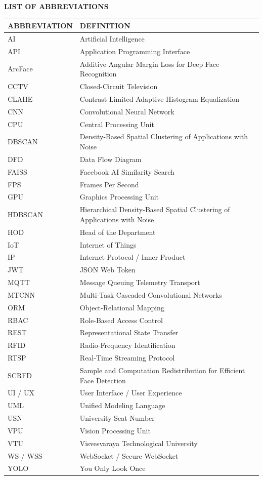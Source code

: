 \newpage
\begin{center}
{\Large \textbf{LIST OF ABBREVIATIONS}}\\[6mm]
\end{center}
\begin{center}
\renewcommand{\arraystretch}{1.3}
\begin{tabular}{p{4cm} p{10cm}}
\toprule
\textbf{ABBREVIATION} & \textbf{DEFINITION} \\
\midrule
AI & Artificial Intelligence \\
API & Application Programming Interface \\
ArcFace & Additive Angular Margin Loss for Deep Face Recognition \\
CCTV & Closed-Circuit Television \\
CLAHE & Contrast Limited Adaptive Histogram Equalization \\
CNN & Convolutional Neural Network \\
CPU & Central Processing Unit \\
DBSCAN & Density-Based Spatial Clustering of Applications with Noise \\
DFD & Data Flow Diagram \\
FAISS & Facebook AI Similarity Search \\
FPS & Frames Per Second \\
GPU & Graphics Processing Unit \\
HDBSCAN & Hierarchical Density-Based Spatial Clustering of Applications with Noise \\
HOD & Head of the Department \\
IoT & Internet of Things \\
IP & Internet Protocol / Inner Product \\
JWT & JSON Web Token \\
MQTT & Message Queuing Telemetry Transport \\
MTCNN & Multi-Task Cascaded Convolutional Networks \\
ORM & Object-Relational Mapping \\
RBAC & Role-Based Access Control \\
REST & Representational State Transfer \\
RFID & Radio-Frequency Identification \\
RTSP & Real-Time Streaming Protocol \\
SCRFD & Sample and Computation Redistribution for Efficient Face Detection \\
UI / UX & User Interface / User Experience \\
UML & Unified Modeling Language \\
USN & University Seat Number \\
VPU & Vision Processing Unit \\
VTU & Visvesvaraya Technological University \\
WS / WSS & WebSocket / Secure WebSocket \\
YOLO & You Only Look Once \\
\bottomrule
\end{tabular}
\end{center}
\newpage
